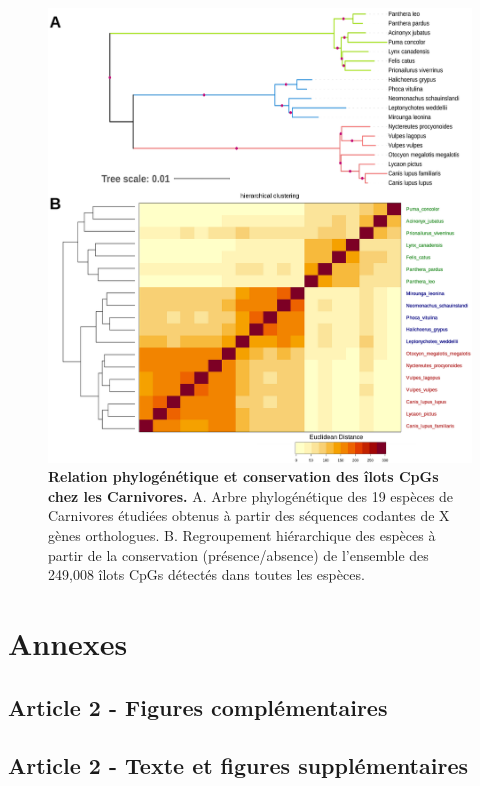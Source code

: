 \begin{figure}[h]
    \centering
    \includegraphics[width=1\textwidth, page=1] {figures/annexes/Canidae-fig1.png}
    \caption[Relation phylogénétique et conservation des îlots CpGs chez les Carnivores.]{
    \textbf{Relation phylogénétique et conservation des îlots CpGs chez les Carnivores.}
    A. Arbre phylogénétique des 19 espèces de Carnivores étudiées obtenus à partir des séquences codantes de X gènes orthologues.
    B. Regroupement hiérarchique des espèces à partir de la conservation (présence/absence) de l'ensemble des 249,008 îlots CpGs détectés dans toutes les espèces.\\
    }
    \label{fig:canidae}
\end{figure} 


\chapter{Annexes}
{\hypersetup{linkcolor=GREYDARK}\minitoc}
\label{chap:annexes}

\section{Article 2 - Figures complémentaires}


\section{Article 2 - Texte et figures supplémentaires}


